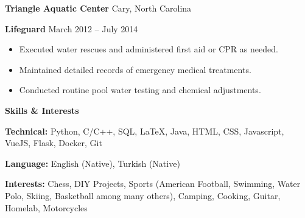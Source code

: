\documentclass[11pt]{article}
\begin{document}
\textbf{Triangle Aquatic Center} \hfill Cary, North Carolina

\textbf{Lifeguard} \hfill March 2012 – July 2014
\begin{itemize}[noitemsep, topsep=0pt, partopsep=0pt, parsep=0pt]
    \item Executed water rescues and administered first aid or CPR as needed.
    \item Maintained detailed records of emergency medical treatments.
    \item Conducted routine pool water testing and chemical adjustments.
\end{itemize}




\begin{center}
    \textbf{Skills \& Interests}
\end{center}

\textbf{Technical:} Python, C/C++, SQL, LaTeX, Java, HTML, CSS, Javascript, VueJS, Flask, Docker, Git

\textbf{Language:} English (Native), Turkish (Native)


\textbf{Interests:} Chess, DIY Projects, Sports (American Football, Swimming, Water Polo, Skiing, Basketball among many others), Camping, Cooking, Guitar, Homelab, Motorcycles
\end{document}
